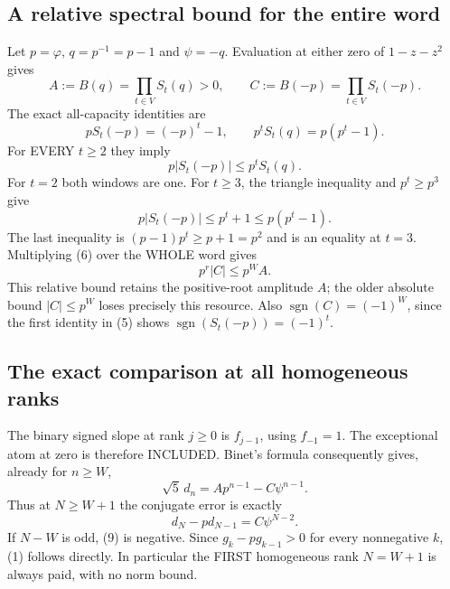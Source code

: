 \subsection*{A relative spectral bound for the entire word}
Let $p=\varphi$, $q=p^{-1}=p-1$ and $\psi=-q$.
Evaluation at either zero of $1-z-z^2$ gives
\[
 A:=B(q)=\prod_{t\in V}S_t(q)>0,\qquad
 C:=B(-p)=\prod_{t\in V}S_t(-p).
\]
The exact all-capacity identities are
\[
 pS_t(-p)=(-p)^t-1,\qquad
 p^t S_t(q)=p(p^t-1).                                  \tag{5}
\]
For EVERY $t\ge2$ they imply
\[
                    p|S_t(-p)|\le p^t S_t(q).           \tag{6}
\]
For $t=2$ both windows are one. For $t\ge3$, the triangle
inequality and $p^t\ge p^3$ give
\[
 p|S_t(-p)|\le p^t+1\le p(p^t-1).
\]
The last inequality is $(p-1)p^t\ge p+1=p^2$ and is an equality
at $t=3$. Multiplying (6) over the WHOLE word gives
\[
                         p^r|C|\le p^W A.              \tag{7}
\]
This relative bound retains the positive-root amplitude $A$;
the older absolute bound $|C|\le p^W$ loses precisely this resource.
Also $\operatorname{sgn}(C)=(-1)^W$, since the first identity in (5)
shows $\operatorname{sgn}(S_t(-p))=(-1)^t$.

\subsection*{The exact comparison at all homogeneous ranks}
The binary signed slope at rank $j\ge0$ is $f_{j-1}$, using
$f_{-1}=1$. The exceptional atom at zero is therefore INCLUDED.
Binet's formula consequently gives, already for $n\ge W$,
\[
               \sqrt5\,d_n=A p^{n-1}-C\psi^{n-1}.       \tag{8}
\]
Thus at $N\ge W+1$ the conjugate error is exactly
\[
                     d_N-pd_{N-1}=C\psi^{N-2}.          \tag{9}
\]
If $N-W$ is odd, (9) is negative. Since $g_k-pg_{k-1}>0$
for every nonnegative $k$, (1) follows directly. In particular
the FIRST homogeneous rank $N=W+1$ is always paid, with no norm bound.

